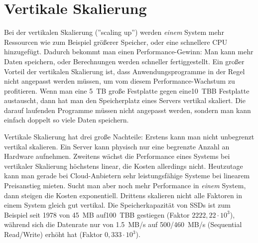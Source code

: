 \section{Vertikale Skalierung}
Bei der vertikalen Skalierung (''scaling up'') werden \textit{einem} System mehr Ressourcen wie zum Beispiel größerer Speicher, oder eine schnellere CPU hinzugefügt. Dadurch bekommt man einen Performance-Gewinn: Man kann mehr Daten speichern, oder Berechnungen werden schneller fertiggestellt. Ein großer Vorteil der vertikalen Skalierung ist, dass Anwendungsprogramme in der Regel nicht angepasst werden müssen, um vom diesem Performance-Wachstum zu profitieren. Wenn man eine 5 TB große Festplatte gegen eine10 TBB Festplatte austauscht, dann hat man den Speicherplatz eines Servers vertikal skaliert. Die darauf laufenden Programme müssen nicht angepasst werden, sondern man kann einfach doppelt so viele Daten speichern.\cite{beaumont_how_2014}
\par
Vertikale Skalierung hat drei große Nachteile: Erstens kann man nicht unbegrenzt vertikal skalieren. Ein Server kann physisch nur eine begrenzte Anzahl an Hardware aufnehmen. Zweitens wächst die Performance eines Systems bei vertikaler Skalierung höchstens linear\cite{gustafson_amdahls_2011}, die Kosten allerdings nicht.\cite{noauthor_horizontal_nodate} Heutzutage kann man gerade bei Cloud-Anbietern sehr leistungsfähige Systeme bei linearem Preisanstieg mieten.\cite{noauthor_pricing_nodate} Sucht man aber noch mehr Performance in \textit{einem} System, dann steigen die Kosten exponentiell\cite{athow_at_2020}. Drittens skalieren nicht alle Faktoren in einem System gleich gut vertikal. Die Speicherkapazität von SSDs ist zum Beispiel seit 1978 von 45 MB auf100 TBB gestiegen (Faktor $2222,22 \cdot 10^{3}$), während sich die Datenrate nur von 1.5 MB/s auf 500/460 MB/s (Sequential Read/Write) erhöht hat (Faktor $0,333 \cdot 10^{3}$).\cite{athow_at_2020}\cite{noauthor_who_nodate}  

